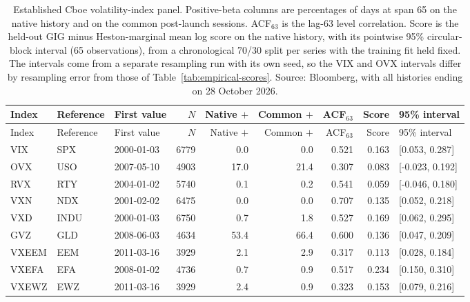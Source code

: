 {\small\setlength{\tabcolsep}{3pt}\begin{longtable}{@{}l P{22mm} l r r r r r l@{}}\caption{Established Cboe volatility-index panel. Positive-beta columns are percentages of days at span 65 on the native history and on the common post-launch sessions. ACF$_{63}$ is the lag-63 level correlation. Score is the held-out GIG minus Heston-marginal mean log score on the native history, with its pointwise 95\% circular-block interval (65 observations), from a chronological 70/30 split per series with the training fit held fixed. The intervals come from a separate resampling run with its own seed, so the VIX and OVX intervals differ by resampling error from those of Table~\ref{tab:empirical-scores}. Source: Bloomberg, with all histories ending on 28 October 2026.}\label{tab:cboe-panel}\\\toprule Index & Reference & First value & $N$ & Native $+$ & Common $+$ & ACF$_{63}$ & Score & 95\% interval\\\midrule\endfirsthead\toprule Index & Reference & First value & $N$ & Native $+$ & Common $+$ & ACF$_{63}$ & Score & 95\% interval\\\midrule\endhead

VIX & SPX & 2000-01-03 & 6779 & 0.0 & 0.0 & 0.521 & 0.163 & [0.053, 0.287] \\

OVX & USO & 2007-05-10 & 4903 & 17.0 & 21.4 & 0.307 & 0.083 & [-0.023, 0.192] \\

RVX & RTY & 2004-01-02 & 5740 & 0.1 & 0.2 & 0.541 & 0.059 & [-0.046, 0.180] \\

VXN & NDX & 2001-02-02 & 6475 & 0.0 & 0.0 & 0.707 & 0.135 & [0.052, 0.218] \\

VXD & INDU & 2000-01-03 & 6750 & 0.7 & 1.8 & 0.527 & 0.169 & [0.062, 0.295] \\

GVZ & GLD & 2008-06-03 & 4634 & 53.4 & 66.4 & 0.600 & 0.136 & [0.047, 0.209] \\

VXEEM & EEM & 2011-03-16 & 3929 & 2.1 & 2.9 & 0.317 & 0.113 & [0.028, 0.184] \\

VXEFA & EFA & 2008-01-02 & 4736 & 0.7 & 0.9 & 0.517 & 0.234 & [0.150, 0.310] \\

VXEWZ & EWZ & 2011-03-16 & 3929 & 2.4 & 0.9 & 0.323 & 0.153 & [0.079, 0.216] \\


\end{longtable}}
